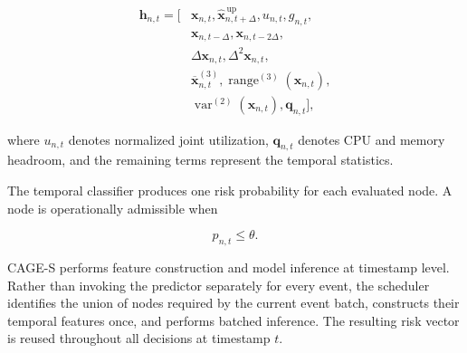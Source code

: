 \begin{equation}
\label{eq:temporal-feature-vector}
\begin{split}
    \mathbf{h}_{n,t}
    =
    \big[
        &\mathbf{x}_{n,t},
        \widehat{\mathbf{x}}^{\,\mathrm{up}}_{n,t+\Delta},
        u_{n,t},
        g_{n,t},\\
        &\mathbf{x}_{n,t-\Delta},
        \mathbf{x}_{n,t-2\Delta},\\
        &\Delta\mathbf{x}_{n,t},
        \Delta^{2}\mathbf{x}_{n,t},\\
        &\overline{\mathbf{x}}^{(3)}_{n,t},
        \operatorname{range}^{(3)}(\mathbf{x}_{n,t}),\\
        &\operatorname{var}^{(2)}(\mathbf{x}_{n,t}),
        \mathbf{q}_{n,t}
    \big],
\end{split}
\end{equation}

where $u_{n,t}$ denotes normalized joint utilization,
$\mathbf{q}_{n,t}$ denotes CPU and memory headroom, and the remaining
terms represent the temporal statistics.

The temporal classifier produces one risk probability for each evaluated
node. A node is operationally admissible when

\begin{equation}
\label{eq:temporal-admission-method}
    p_{n,t}\leq\theta.
\end{equation}

CAGE-S performs feature construction and model inference at timestamp
level. Rather than invoking the predictor separately for every event,
the scheduler identifies the union of nodes required by the current event
batch, constructs their temporal features once, and performs batched
inference. The resulting risk vector is reused throughout all decisions
at timestamp $t$.

\begin{algorithm}[t]
\caption{Timestamp-level temporal-state preparation}
\label{alg:temporal-preparation}

\;
\end{algorithm}

